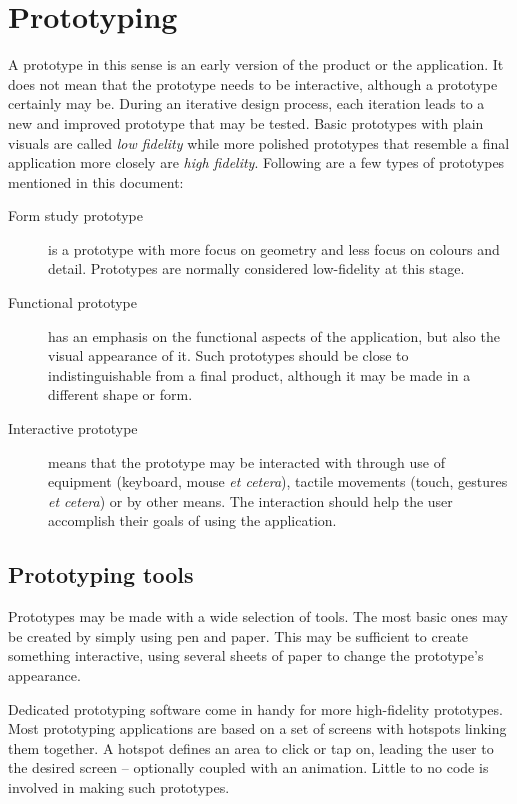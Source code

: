 \section{Prototyping}
\label{sec:prototyping}

A prototype in this sense is an early version of the product or the application. It does not mean that the prototype needs to be interactive, although a prototype certainly may be. During an iterative design process, each iteration leads to a new and improved prototype that may be tested. Basic prototypes with plain visuals are called \emph{low fidelity} while more polished prototypes that resemble a final application more closely are \emph{high fidelity}. Following are a few types of prototypes mentioned in this document:

\begin{description}
    \item[Form study prototype] is a prototype with more focus on geometry and less focus on colours and detail. Prototypes are normally considered low-fidelity at this stage.
    \item[Functional prototype] has an emphasis on the functional aspects of the application, but also the visual appearance of it. Such prototypes should be close to indistinguishable from a final product, although it may be made in a different shape or form.
    \item[Interactive prototype] means that the prototype may be interacted with through use of equipment (keyboard, mouse \emph{et cetera}), tactile movements (touch, gestures \emph{et cetera}) or by other means. The interaction should help the user accomplish their goals of using the application.
\end{description}

\subsection{Prototyping tools}

Prototypes may be made with a wide selection of tools. The most basic ones may be created by simply using pen and paper. This may be sufficient to create something interactive, using several sheets of paper to change the prototype's appearance.

Dedicated prototyping software come in handy for more high-fidelity prototypes. Most prototyping applications are based on a set of screens with hotspots linking them together. A hotspot defines an area to click or tap on, leading the user to the desired screen -- optionally coupled with an animation. Little to no code is involved in making such prototypes.


